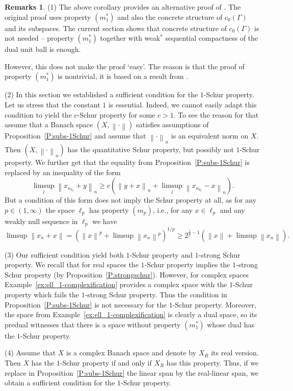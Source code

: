 \documentclass{amsart}
\numberwithin{equation}{section}
\theoremstyle{definition}
\newtheorem{remarks}[thm]{Remarks}
\newcommand{\norm}[1]{\left\|#1\right\|}
\begin{document}
\begin{remarks}\label{rem:m1}
    (1) The above corollary provides an alternative proof of \cite[Theorem 1.1]{qschur-dp}. The original proof uses property $(m_1^*)$ and also the concrete structure of $c_0(\Gamma)$ and its subspaces. The current section shows that concrete structure of $c_0(\Gamma)$ is not needed -- property $(m_1^*)$ together with weak$^*$ sequential compactness of the dual unit ball is enough.

    However, this does not make the proof `easy'. The reason is that the proof of property $(m_1^*)$ is nontrivial, it is based on a result from \cite{kalton-werner}.

    (2) In this section we established a sufficient condition for the $1$-Schur property. Let us stress that the constant $1$ is essential. Indeed, we cannot easily adapt this condition to yield the $c$-Schur property for some $c>1$. To see the reason for that assume that a Banach space $(X,\norm{\cdot})$ satisfies assumptions of Proposition~\ref{P:subs-1Schur} and assume that $\norm{\cdot}_n$ is an equivalent norm on $X$. Then $(X,\norm{\cdot}_n)$ has the quantitative Schur property, but possibly not $1$-Schur property. We further get that
    the equality from Proposition~\ref{P:subs-1Schur} is replaced by an inequality of the form
    $$\limsup_{l}\norm{x_{n_{k_l}}+y}_n\ge c(\norm{y+x}_n+\limsup_l
    \norm{x_{n_{k_l}}-x}_n).$$
    But a condition of this form does not imply the Schur property at all, as for any $p\in (1,\infty)$ the space $\ell_p$ has property $(m_p)$, i.e., for any $x\in\ell_p$ and any weakly null sequence in $\ell_p$ we have
    $$\limsup\norm{x_n+x}=\left(\norm{x}^p+\limsup\norm{x_n}^p\right)^{1/p}\ge 2^{\frac1p-1}(\norm{x}+\limsup\norm{x_n}).$$

    (3) Our sufficient condition yield both $1$-Schur property and $1$-strong Schur property. We recall that for real spaces the $1$-Schur property implies the $1$-strong Schur property (by Proposition~\ref{P:strongschur}). However, for complex spaces Example~\ref{ex:ell_1-complexification} provides a complex space with the $1$-Schur property which fails the $1$-strong Schur property. Thus the condition in Proposition~\ref{P:subs-1Schur} is not necessary for the $1$-Schur property. Moreover, the space from Example~\ref{ex:ell_1-complexification} is clearly a dual space, so its predual witnesses that there is a space without property $(m_1^*)$ whose dual has the $1$-Schur property.

    (4) Assume that $X$ is a complex Banach space and denote by $X_R$ its real version. Then $X$ has the $1$-Schur property if and only if $X_R$ has this property. Thus, if we replace in Proposition~\ref{P:subs-1Schur} the linear span by the real-linear span, we obtain a sufficient condition for the $1$-Schur property.
\end{remarks}
\end{document}
